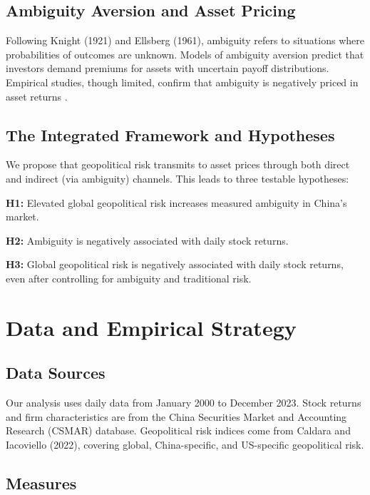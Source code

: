 \documentclass[12pt]{article}
\begin{document}
\subsection{Ambiguity Aversion and Asset Pricing}

Following Knight (1921) and Ellsberg (1961), ambiguity refers to situations where probabilities of outcomes are unknown. Models of ambiguity aversion \citep{gilboa1989maxmin,klibanoff2005smooth} predict that investors demand premiums for assets with uncertain payoff distributions. Empirical studies, though limited, confirm that ambiguity is negatively priced in asset returns \citep{brenner2018ambiguity}.

\subsection{The Integrated Framework and Hypotheses}

We propose that geopolitical risk transmits to asset prices through both direct and indirect (via ambiguity) channels. This leads to three testable hypotheses:

\textbf{H1:} Elevated global geopolitical risk increases measured ambiguity in China's market.

\textbf{H2:} Ambiguity is negatively associated with daily stock returns.

\textbf{H3:} Global geopolitical risk is negatively associated with daily stock returns, even after controlling for ambiguity and traditional risk.

\section{Data and Empirical Strategy}

\subsection{Data Sources}

Our analysis uses daily data from January 2000 to December 2023. Stock returns and firm characteristics are from the China Securities Market and Accounting Research (CSMAR) database. Geopolitical risk indices come from Caldara and Iacoviello (2022), covering global, China-specific, and US-specific geopolitical risk.

\subsection{Measures}
\end{document}

